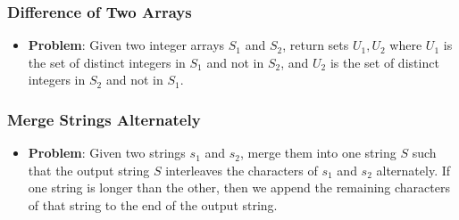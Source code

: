 \documentclass[10pt,a4paper]{article}
\begin{document}
\subsubsection*{Difference of Two Arrays}
\begin{itemize}
    \item \textbf{Problem}: Given two integer arrays $S_1$ and $S_2$, return sets $U_1,U_2$ where $U_1$ is the set of distinct integers in $S_1$ and not in $S_2$, and $U_2$ is the set of distinct integers in $S_2$ and not in $S_1$.
\end{itemize}

\subsubsection*{Merge Strings Alternately}
\begin{itemize}
    \item \textbf{Problem}: Given two strings $s_1$ and $s_2$, merge them into one string $S$ such that the output string $S$ interleaves the characters of $s_1$ and $s_2$ alternately. If one string is longer than the other, then we append the remaining characters of that string to the end of the output string.
\end{itemize}
\end{document}
